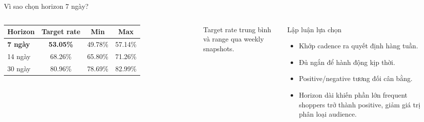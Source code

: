 \documentclass[aspectratio=169,11pt]{beamer}
\begin{document}
\begin{frame}{Vì sao chọn horizon 7 ngày?}
  \begin{columns}[T,onlytextwidth]
      \begin{tabular}{lccc}
        \toprule
        Horizon & Target rate & Min & Max \\
        \midrule
        \textbf{7 ngày} & \textbf{53.05\%} & 49.78\% & 57.14\% \\
        14 ngày & 68.26\% & 65.80\% & 71.26\% \\
        30 ngày & 80.96\% & 78.69\% & 82.99\% \\
        \bottomrule
      \end{tabular}
      \vspace{0.35cm}
      {\small Target rate trung bình và range qua weekly snapshots.}
      \begin{alertblock}{Lập luận lựa chọn}
        \begin{itemize}
          \item Khớp cadence ra quyết định hàng tuần.
          \item Đủ ngắn để hành động kịp thời.
          \item Positive/negative tương đối cân bằng.
          \item Horizon dài khiến phần lớn frequent shoppers trở thành positive,
            giảm giá trị phân loại audience.
        \end{itemize}
      \end{alertblock}
  \end{columns}
\end{frame}
\end{document}
